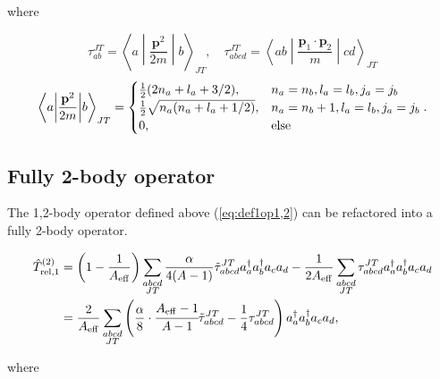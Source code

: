 \documentclass{article}
\begin{document}
where

\begin{equation}\label{eq:tab,tabcd}
  \tau_{ab}^{JT} = \left\langle a\middle|
  \frac{\textbf{p}^2}{2m} \middle|b\right\rangle_{JT}, \quad
  \tau_{abcd}^{JT} = \left\langle ab\middle|
  \frac{\textbf{p}_1\cdot\textbf{p}_2}{m} \middle|cd\right\rangle_{JT}
\end{equation}
\begin{equation*}
  \left\langle a\middle|
  \frac{\textbf{p}^2}{2m} \middle|b\right\rangle_{JT} = 
  \begin{cases}
    \frac{1}{2}(2n_a+l_a+3/2),
    & n_a=n_b, l_a=l_b, j_a=j_b\\
    \frac{1}{2}\sqrt{n_a(n_a+l_a+1/2)}, 
    & n_a=n_b+1, l_a=l_b, j_a=j_b\\
    0, & \rm{else}
  \end{cases}.
\end{equation*}

\subsection{Fully 2-body operator}

The 1,2-body operator defined above (\ref{eq:def1op1,2}) can be
refactored into a fully 2-body operator.

\begin{equation}\label{eq:def1op2}
  \begin{aligned}
    \hat{T}_{\rm{rel},1}^{(2)} &= \left(1-\frac{1}{A_{\rm{eff}}}\right)
    \displaystyle\sum_{\substack{abcd\\JT}} \frac{\alpha}{4(A-1)}
    \tilde{\tau}_{abcd}^{JT} a_a^{\dagger}a_b^{\dagger}a_ca_d
    -\frac{1}{2A_{\rm{eff}}} \displaystyle\sum_{\substack{abcd\\JT}}
    \tau_{abcd}^{JT} a_a^{\dagger}a_b^{\dagger}a_ca_d\\
    &= \frac{2}{A_{\rm{eff}}} \displaystyle\sum_{\substack{abcd\\JT}}
    \left(
    \frac{\alpha}{8}\cdot\cfrac{A_{\rm{eff}}-1}{A-1}
    \tilde{\tau}_{abcd}^{JT} -\frac{1}{4}\tau_{abcd}^{JT}
    \right) a_a^{\dagger}a_b^{\dagger}a_ca_d,
  \end{aligned}
\end{equation}

where
\end{document}

